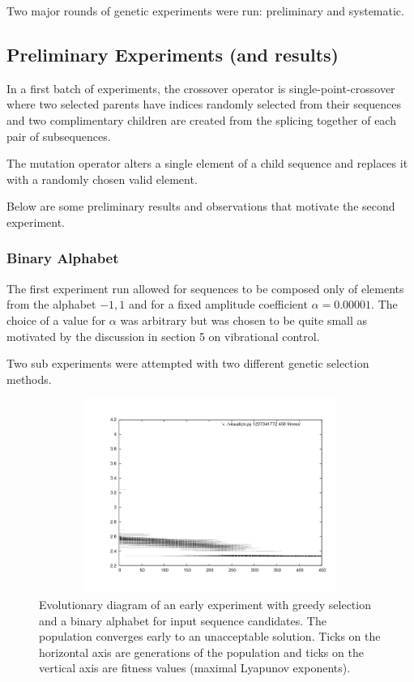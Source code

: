 \documentclass[12pt]{article}
\begin{document}
Two major rounds of genetic experiments were run: preliminary and systematic.

\subsection{Preliminary Experiments (and results)}

In a first batch of experiments, the crossover operator is
single-point-crossover where two selected parents
have indices randomly selected from their sequences and two complimentary
children are created from the splicing together of each pair of subsequences.

The mutation operator alters a single element of a child sequence and
replaces it with a randomly chosen valid element.

Below are some preliminary results and observations that motivate the second
experiment.

\subsubsection{Binary Alphabet}
The first experiment run allowed for sequences to be composed only of elements
from the alphabet ${-1, 1}$ and for a fixed amplitude coefficient
$\alpha=0.00001$.  The choice of a value for $\alpha$ was arbitrary but was
chosen to be quite small as motivated by the discussion in section 5 on
vibrational control.

Two sub experiments were attempted with two different genetic selection methods.

\begin{figure}[htb]
\begin{center}
\includegraphics[height=2.5in,width=4.5in]{images/early_exp_greedy.png}
\caption{Evolutionary diagram of an early experiment with greedy selection and a binary alphabet for input sequence candidates.  The population converges early to an unacceptable solution.  Ticks on the horizontal axis are generations of the population and ticks on the vertical axis are fitness values (maximal Lyapunov exponents).}
\end{center}
\end{figure}
\end{document}
